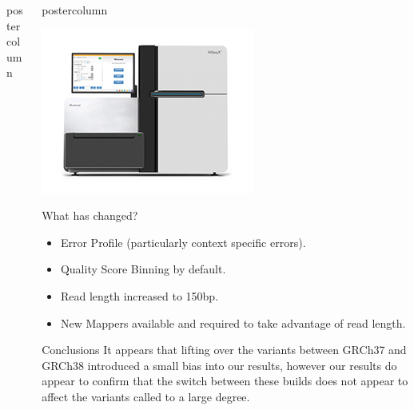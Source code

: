 \documentclass[final]{beamer}
\begin{document}
\begin{frame}{}
\begin{columns}
\begin{column}{.49\textwidth}
\begin{beamercolorbox}[center,wd=\textwidth]{postercolumn}
\begin{minipage}[T]{.95\textwidth}
            \end{minipage}
        \end{beamercolorbox}
    \end{column}
        \begin{column}{.49\textwidth}
        \begin{beamercolorbox}[center,wd=\textwidth]{postercolumn}
            \begin{minipage}[T]{.95\textwidth}  %
            \begin{block}{}
                \includegraphics[width=.95\linewidth]{images/hiseq-x}
            \end{block}
            \begin{block}{What has changed?}
                \begin{itemize} 
                    \item Error Profile (particularly context specific errors).
                    \item Quality Score Binning by default.
                    \item Read length increased to 150bp.
                    \item New Mappers available and required to take advantage of read length.
                \end{itemize}
            \end{block}
            \begin{block}{Conclusions}
                It appears that lifting over the variants between GRCh37 and GRCh38 introduced a small bias into our results, however our results do appear to confirm that the switch between these builds does not appear to affect the variants called to a large degree.

\end{block}
\end{minipage}
\end{beamercolorbox}
\end{column}
\end{columns}
\end{frame}
\end{document}
